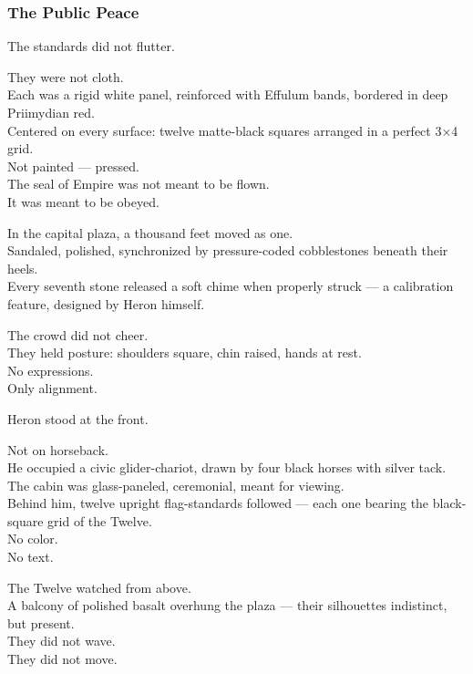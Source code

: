 \documentclass[12pt]{article}
\begin{document}
\dotfill

\subsubsection*{The Public Peace}

The standards did not flutter.

They were not cloth.\\
Each was a rigid white panel, reinforced with Effulum bands, bordered in deep Priimydian red.\\
Centered on every surface: twelve matte-black squares arranged in a perfect 3×4 grid.\\
Not painted — pressed.\\
The seal of Empire was not meant to be flown.\\
It was meant to be obeyed.

\vspace{1em}

In the capital plaza, a thousand feet moved as one.\\
Sandaled, polished, synchronized by pressure-coded cobblestones beneath their heels.\\
Every seventh stone released a soft chime when properly struck — a calibration feature, designed by Heron himself.

The crowd did not cheer.\\
They held posture: shoulders square, chin raised, hands at rest.\\
No expressions.\\
Only alignment.

Heron stood at the front.

Not on horseback.\\
He occupied a civic glider-chariot, drawn by four black horses with silver tack.\\
The cabin was glass-paneled, ceremonial, meant for viewing.\\
Behind him, twelve upright flag-standards followed — each one bearing the black-square grid of the Twelve.\\
No color.\\
No text.

\vspace{1em}

The Twelve watched from above.\\
A balcony of polished basalt overhung the plaza — their silhouettes indistinct, but present.\\
They did not wave.\\
They did not move.
\end{document}
